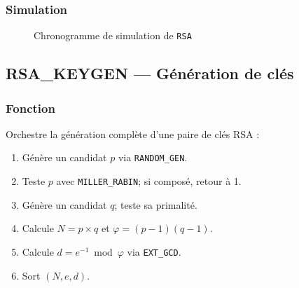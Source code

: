 \documentclass[12pt,a4paper]{report}
\begin{document}
\subsubsection{Simulation}
\begin{figure}[H]
\centering
{}
\caption{Chronogramme de simulation de \texttt{RSA}}
\label{fig:sim_rsa}
\end{figure}


\subsection{RSA\_KEYGEN --- Génération de clés}
\label{sec:keygen}

\subsubsection{Fonction}
Orchestre la génération complète d'une paire de clés RSA :
\begin{enumerate}
  \item Génère un candidat $p$ via \texttt{RANDOM\_GEN}.
  \item Teste $p$ avec \texttt{MILLER\_RABIN}; si composé, retour à 1.
  \item Génère un candidat $q$; teste sa primalité.
  \item Calcule $N = p \times q$ et $\varphi = (p-1)(q-1)$.
  \item Calcule $d = e^{-1} \bmod \varphi$ via \texttt{EXT\_GCD}.
  \item Sort $(N, e, d)$.
\end{enumerate}
\end{document}
